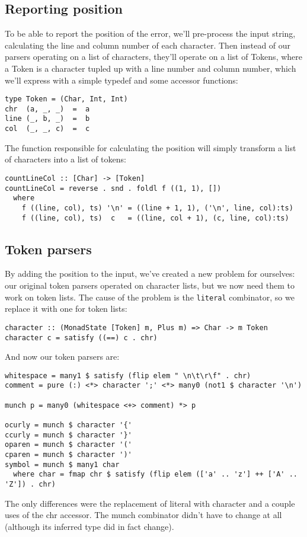 \documentclass{tmr}
\begin{document}
\subsection{Reporting position}
To be able to report the position of the error, we'll pre-process the input
string, calculating the line and column number of each character.  Then instead 
of our parsers operating on a list of characters, they'll operate on a list of 
Tokens, where a Token is a character tupled up with a line number and column 
number, which we'll express with a simple typedef and some accessor functions:
\begin{verbatim}
type Token = (Char, Int, Int)
chr  (a, _, _)  =  a
line (_, b, _)  =  b
col  (_, _, c)  =  c
\end{verbatim}
The function responsible for calculating the position will simply transform a 
list of characters into a list of tokens:
\begin{verbatim}
countLineCol :: [Char] -> [Token]
countLineCol = reverse . snd . foldl f ((1, 1), [])
  where
    f ((line, col), ts) '\n' = ((line + 1, 1), ('\n', line, col):ts)
    f ((line, col), ts)  c   = ((line, col + 1), (c, line, col):ts)
\end{verbatim}

\subsection{Token parsers}
By adding the position to the input, we've created a new problem 
for ourselves: our original token parsers operated on 
character lists, but we now need them to work on token lists.  
The cause of the problem is the \verb+literal+ combinator, so we
replace it with one for token lists:
\begin{verbatim}
character :: (MonadState [Token] m, Plus m) => Char -> m Token
character c = satisfy ((==) c . chr)
\end{verbatim}
And now our token parsers are:
\begin{verbatim}
whitespace = many1 $ satisfy (flip elem " \n\t\r\f" . chr)
comment = pure (:) <*> character ';' <*> many0 (not1 $ character '\n')

munch p = many0 (whitespace <+> comment) *> p

ocurly = munch $ character '{'
ccurly = munch $ character '}'
oparen = munch $ character '('
cparen = munch $ character ')'
symbol = munch $ many1 char
  where char = fmap chr $ satisfy (flip elem (['a' .. 'z'] ++ ['A' .. 'Z']) . chr)
\end{verbatim}
The only differences were the replacement of literal with character and a couple
uses of the chr accessor.  The munch combinator didn't have to change at all 
(although its inferred type did in fact change).
\end{document}

